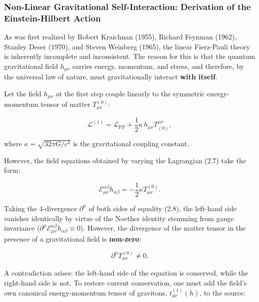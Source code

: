 \subsubsection{Non-Linear Gravitational Self-Interaction: Derivation of the Einstein-Hilbert Action}\label{sec:2.1.2}

As was first realized by Robert Kraichnan \cite{ref13} (1955), Richard Feynman (1962), Stanley Deser \cite{ref14} (1970), and Steven Weinberg (1965), the linear Fierz-Pauli theory is inherently incomplete and inconsistent. The reason for this is that the quantum gravitational field $h_{\mu\nu}$ carries energy, momentum, and stress, and therefore, by the universal law of nature, must gravitationally interact \textbf{with itself}.

Let the field $h_{\mu\nu}$ at the first step couple linearly to the symmetric energy-momentum tensor of matter $T_{\mu\nu}^{(0)}$:

\begin{equation}\label{eq:2.7}\tag{2.7}
\mathcal{L}^{(1)} = \mathcal{L}_{\text{FP}} + \frac{1}{2}\kappa \, h_{\mu\nu} T^{\mu\nu}_{(0)},
\end{equation}

where $\kappa = \sqrt{32\pi G / c^4}$ is the gravitational coupling constant.

However, the field equations obtained by varying the Lagrangian (2.7) take the form:

\begin{equation}\label{eq:2.8}\tag{2.8}
\mathcal{E}_{\mu\nu}^{\alpha\beta} h_{\alpha\beta} = -\frac{1}{2}\kappa T_{\mu\nu}^{(0)}.
\end{equation}

Taking the 4-divergence $\partial^\mu$ of both sides of equality (2.8), the left-hand side vanishes identically by virtue of the Noether identity stemming from gauge invariance ($\partial^\mu \mathcal{E}_{\mu\nu}^{\alpha\beta} h_{\alpha\beta} \equiv 0$). However, the divergence of the matter tensor in the presence of a gravitational field is \textbf{non-zero}:

\begin{equation}\label{eq:2.9}\tag{2.9}
\partial^\mu T_{\mu\nu}^{(0)} \ne 0.
\end{equation}

A contradiction arises: the left-hand side of the equation is conserved, while the right-hand side is not. To restore current conservation, one must add the field's own canonical energy-momentum tensor of gravitons, $t_{\mu\nu}^{(1)}(h)$, to the source:

